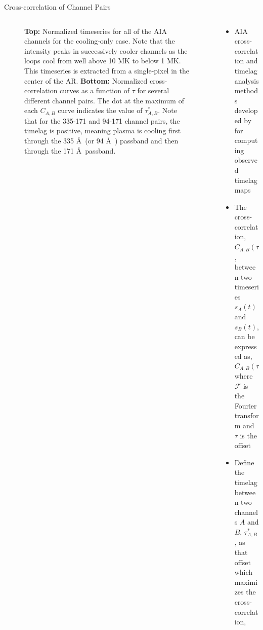 \documentclass[final]{beamer}
\newcommand{\ang}{\AA~} %
\begin{document}
\begin{frame}
\begin{columns}[T]
\begin{column}{0.49\linewidth}
\begin{block}{Cross-correlation of Channel Pairs}
\begin{columns}[c]
\begin{column}{0.49\columnwidth}
\begin{figure}
{                \label{fig:aia_lightcurves}}
                \caption{\textbf{Top:} Normalized timeseries for all of the AIA channels for the cooling-only case. Note that the intensity peaks in successively cooler channels as the loops cool from well above 10 MK to below 1 MK. This timeseries is extracted from a single-pixel in the center of the AR. \textbf{Bottom:} Normalized cross-correlation curves as a function of $\tau$ for several different channel pairs. The dot at the maximum of each $C_{A,B}$ curve indicates the value of $\tau^*_{A,B}$. Note that for the 335-171 and 94-171 channel pairs, the timelag is positive, meaning plasma is cooling first through the 335 \ang (or 94 \ang) passband and then through the 171 \ang passband.}
            \end{figure}
            \end{column}
            \begin{column}{0.49\columnwidth}
                \begin{itemize}
                    \item AIA cross-correlation and timelag analysis methods developed by \citet{viall_evidence_2012} for computing observed timelag maps 
                    \item The cross-correlation, $C_{A,B}(\tau)$, between two timeseries $s_A(t)$ and $s_B(t)$, can be expressed as,
                    \begin{equation}
                        C_{A,B}(\tau) = \mathcal{F}^{-1}\{\mathcal{F}\{s_A(-t)\}\mathcal{F}\{s_B(t)\}\}
                    \end{equation}
                    where $\mathcal{F}$ is the Fourier transform and $\tau$ is the offset
                    \item Define the \alert{timelag} between two channels $A$ and $B$, $\tau^*_{A,B}$, as that offset which maximizes the cross-correlation,

\end{itemize}
\end{column}
\end{columns}
\end{block}
\end{column}
\end{columns}
\end{frame}
\end{document}
